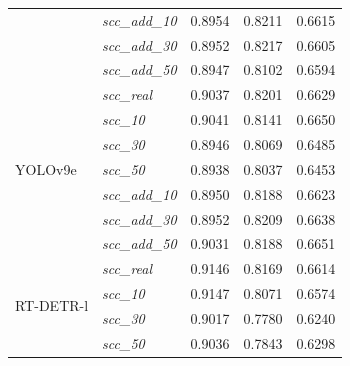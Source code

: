 \begin{table}[h!]
{\begin{tabular}{l|l|c|c|c}
                                      & \textit{scc\_add\_10}   & 0.8954                    & 0.8211                     & 0.6615                    \\
                                      & \textit{scc\_add\_30}   & 0.8952                    & 0.8217                     & 0.6605                    \\
                                      & \textit{scc\_add\_50}   & 0.8947                    & 0.8102                     & 0.6594                    \\
        \midrule
        \multirow[t]{7}{*}{YOLOv9e}   & \textit{scc\_real} & 0.9037                     & \cellcolor{blue!10}0.8201 & 0.6629     \\
                                      & \textit{scc\_10}   & \cellcolor{blue!10}0.9041  & 0.8141                    & \cellcolor{blue!10}0.6650 \\
                                      & \textit{scc\_30}   & 0.8946                     & 0.8069                    & 0.6485                    \\
                                      & \textit{scc\_50}   & 0.8938                     & 0.8037                    & 0.6453                    \\
                                      & \textit{scc\_add\_10}   & 0.8950                    & 0.8188                     & 0.6623                    \\
                                      & \textit{scc\_add\_30}   & 0.8952                    & 0.8209                     & 0.6638                    \\
                                      & \textit{scc\_add\_50}   & 0.9031                    & 0.8188                     & 0.6651                    \\
        \midrule
        \multirow[t]{7}{*}{RT-DETR-l} & \textit{scc\_real} & 0.9146                     & \cellcolor{blue!10}0.8169  & \cellcolor{blue!10}0.6614     \\
                                      & \textit{scc\_10}   & \cellcolor{blue!10}0.9147  & 0.8071                    & 0.6574                    \\
                                      & \textit{scc\_30}   & 0.9017                     & 0.7780                    & 0.6240                    \\
                                      & \textit{scc\_50}   & 0.9036                     & 0.7843                    & 0.6298                    \\

\end{tabular}}
\end{table}
